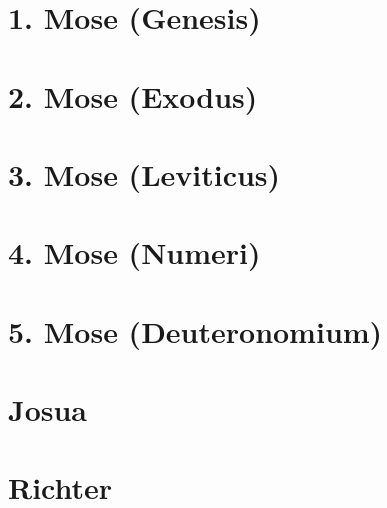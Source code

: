 \chapter{1. Mose (Genesis)}
\begin{multicols}{2}
  \raggedcolumns
  \parskip=0pt \relax
  
\end{multicols}

\chapter{2. Mose (Exodus)}
\begin{multicols}{2}
  \raggedcolumns
  \parskip=0pt \relax
  
\end{multicols}

\chapter{3. Mose (Leviticus)}
\begin{multicols}{2}
  \raggedcolumns
  \parskip=0pt \relax
  
\end{multicols}

\chapter{4. Mose (Numeri)}
\begin{multicols}{2}
  \raggedcolumns
  \parskip=0pt \relax
  
\end{multicols}

\chapter{5. Mose (Deuteronomium)}
\begin{multicols}{2}
  \raggedcolumns
  \parskip=0pt \relax
  
\end{multicols}

\chapter{Josua}
\begin{multicols}{2}
  \raggedcolumns
  \parskip=0pt \relax
  
\end{multicols}

\chapter{Richter}
\begin{multicols}{2}
  \raggedcolumns
  \parskip=0pt \relax
  
\end{multicols}


